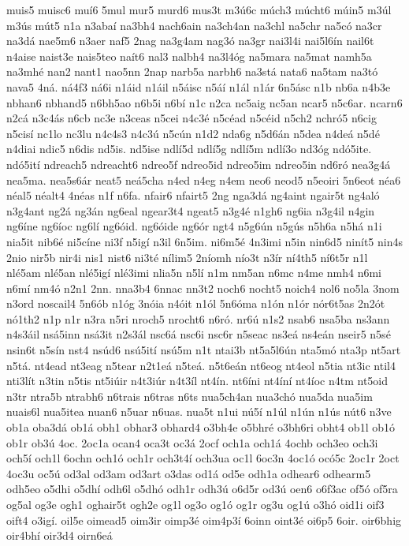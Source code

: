 {muis5
muisc6
muí6
5mul
mur5
murd6
mus3t
m3ú6c
múch3
múcht6
múin5
m3úl
m3ús
mút5
n1a
n3abaí
na3bh4
nach6ain
na3ch4an
na3chl
na5chr
na5có
na3cr
na3dá
nae5m6
n3aer
naf5
2nag
na3g4am
nag3ó
na3gr
nai3l4i
nai5l6ín
nail6t
n4aise
naist3e
nais5teo
naít6
nal3
nalbh4
na3l4óg
na5mara
na5mat
namh5a
na3mhé
nan2
nant1
nao5nn
2nap
narb5a
narbh6
na3stá
nata6
na5tam
na3tó
nava5
4ná.
ná4f3
ná6i
n1áid
n1áil
n5áisc
n5áí
n1ál
n1ár
6n5ásc
n1b
nb6a
n4b3e
nbhan6
nbhand5
n6bh5ao
n6b5i
n6bí
n1c
n2ca
nc5aig
nc5an
ncar5
n5c6ar.
ncarn6
n2cá
n3c4ás
n6cb
nc3e
n3ceas
n5cei
n4c3é
n5céad
n5céid
n5ch2
nchró5
n6cig
n5cisí
nc1lo
nc3lu
n4c4s3
n4c3ú
n5cún
n1d2
nda6g
n5d6án
n5dea
n4deá
n5dé
n4diai
ndic5
n6dis
nd5is.
nd5ise
ndlí5d
ndlí5g
ndlí5m
ndlí3o
nd3óg
ndó5ite.
ndó5ití
ndreach5
ndreacht6
ndreo5f
ndreo5id
ndreo5im
ndreo5in
nd6ró
nea3g4á
nea5ma.
nea5s6ár
neat5
neá5cha
n4ed
n4eg
n4em
neo6
neod5
n5eoiri
5n6eot
néa6
néal5
néalt4
4néas
n1f
n6fa.
nfair6
nfairt5
2ng
nga3dá
ng4aint
ngair5t
ng4aló
n3g4ant
ng2á
ng3án
ng6eal
ngear3t4
ngeat5
n3g4é
n1gh6
ng6ia
n3g4il
n4gin
ng6íne
ng6íoc
ng6lí
ng6óid.
ng6óide
ng6ór
ngt4
n5g6ún
n5gús
n5h6a
n5há
n1i
nia5it
nib6é
ni5cíne
ni3f
n5igí
n3il
6n5im.
ni6m5é
4n3imi
n5in
nin6d5
ninít5
nin4s
2nio
nir5b
nir4i
nis1
nist6
ni3té
nílim5
2níomh
nío3t
n3ír
ní4th5
ní6t5r
n1l
nlé5am
nlé5an
nlé5igí
nlé3imi
nlia5n
n5lí
n1m
nm5an
n6mc
n4me
nmh4
n6mi
n6mí
nm4ó
n2n1
2nn.
nna3b4
6nnac
nn3t2
noch6
nocht5
noich4
nol6
no5la
3nom
n3ord
noscail4
5n6ób
n1óg
3nóia
n4óit
n1ól
5n6óma
n1ón
n1ór
nór6t5as
2n2ót
nó1th2
n1p
n1r
n3ra
n5ri
nroch5
nrocht6
n6ró.
nr6ú
n1s2
nsab6
nsa5ba
ns3ann
n4s3áil
nsá5inn
nsá3it
n2s3ál
nsc6á
nsc6i
nsc6r
n5seac
ns3eá
ns4eán
nseir5
n5sé
nsin6t
n5sín
nst4
nsúd6
nsú5ití
nsú5m
n1t
ntai3b
nt5a5l6ún
nta5mó
nta3p
nt5art
n5tá.
nt4ead
nt3eag
n5tear
n2t1eá
n5teá.
n5t6eán
nt6eog
nt4eol
n5tia
nt3ic
ntil4
nti3lít
n3tin
n5tis
nt5iúir
n4t3iúr
n4t3íl
nt4ín.
nt6íni
nt4íní
nt4íoc
n4tm
nt5oid
n3tr
ntra5b
ntrabh6
n6trais
n6tras
n6ts
nua5ch4an
nua3chó
nua5da
nua5im
nuais6l
nua5itea
nuan6
n5uar
n6uas.
nua5t
n1ui
nú5í
n1úl
n1ún
n1ús
nút6
n3ve
ob1a
oba3dá
ob1á
obh1
obhar3
obhard4
o3bh4e
o5bhré
o3bh6ri
obht4
ob1l
ob1ó
ob1r
ob3ú
4oc.
2oc1a
ocan4
oca3t
oc3á
2ocf
och1a
och1á
4ochb
och3eo
och3i
och5í
och1l
6ochn
och1ó
och1r
och3t4í
och3ua
oc1l
6oc3n
4oc1ó
ocó5c
2oc1r
2oct
4oc3u
oc5ú
od3al
od3am
od3art
o3das
od1á
od5e
odh1a
odhear6
odhearm5
odh5eo
o5dhi
o5dhí
odh6l
o5dhó
odh1r
odh3ú
o6d5r
od3ú
oen6
o6f3ac
of5ó
of5ra
og5al
og3e
ogh1
oghair5t
ogh2e
og1l
og3o
og1ó
og1r
og3u
og1ú
o3hó
oid1i
oif3
oift4
o3igí.
oil5e
oimead5
oim3ir
oimp3é
oim4p3í
6oinn
oint3é
oi6p5
6oir.
oir6bhig
oir4bhí
oir3d4
oirn6eá
}
